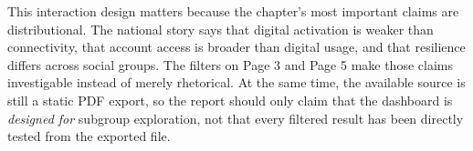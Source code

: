 \documentclass[../main.tex]{subfiles}
\begin{document}
This interaction design matters because the chapter's most important claims are
distributional. The national story says that digital activation is weaker than
connectivity, that account access is broader than digital usage, and that
resilience differs across social groups. The filters on Page 3 and Page 5 make
those claims investigable instead of merely rhetorical. At the same time, the
available source is still a static PDF export, so the report should only claim
that the dashboard is \emph{designed for} subgroup exploration, not that every
filtered result has been directly tested from the exported file.

\end{document}
